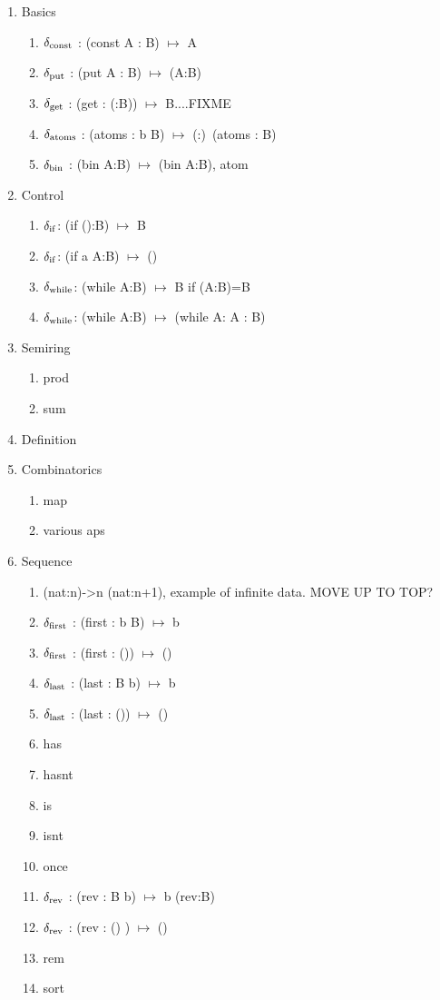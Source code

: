 \documentclass[11pt]{article}
\begin{document}
\begin{enumerate}
\item {Basics
\begin{enumerate}
\item{$\delta_{\rm const}$ : (const A : B) $\mapsto$ A}
\item{$\delta_{\rm put}$ : (put A : B) $\mapsto$ (A:B)} 
\item{$\delta_{\rm get}$ : (get : (:B)) $\mapsto$ B....FIXME}
\item{$\delta_{\rm atoms}$ : (atoms : b B) $\mapsto$ (:)\ (atoms : B)}
\item{$\delta_{\rm bin}$ : (bin A:B) $\mapsto$ (bin A:B), atom} 
\end{enumerate}
}
\item {Control
\begin{enumerate}
\item{$\delta_{\rm if}$: (if ():B) $\mapsto$ B }
\item{$\delta_{\rm if}$: (if a A:B) $\mapsto$ () }
\item{$\delta_{\rm while}$: (while A:B) $\mapsto$ B if (A:B)=B }
\item{$\delta_{\rm while}$: (while A:B) $\mapsto$ (while A: A : B) }
\end{enumerate}
}
\item{Semiring
\begin{enumerate}
\item{prod}
\item{sum}
\end{enumerate}
}
\item{Definition}
\item{Combinatorics} 
\begin{enumerate}
\item{map}
\item{various aps}
\end{enumerate}
\item{Sequence 
\begin{enumerate}
\item{(nat:n)->n (nat:n+1), example of infinite data.  MOVE UP TO TOP?}
\item{$\delta_{\rm first}$ : (first : b B) $\mapsto$ b}
\item{$\delta_{\rm first}$ : (first : ()) $\mapsto$ ()} 
\item{$\delta_{\rm last}$ : (last : B b) $\mapsto$ b} 
\item{$\delta_{\rm last}$ : (last : ()) $\mapsto$ ()} 
\item{has}
\item{hasnt}
\item{is}
\item{isnt} 
\item{once} 
\item{$\delta_{\rm rev}$ : (rev : B b) $\mapsto$ b (rev:B)} 
\item{$\delta_{\rm rev}$ : (rev : () ) $\mapsto$ ()}
\item{rem} 
\item{sort} 
\end{enumerate} 
}
\end{enumerate}
\end{document}
